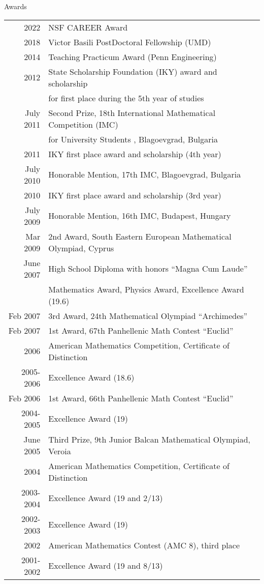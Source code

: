 \documentclass{resume} %
\begin{document}
\begin{rSection}{Awards}

  \begin{longtable}{rl}
  2022 & NSF CAREER Award \\
  2018 & Victor Basili PostDoctoral Fellowship (UMD)\\
  2014	 & Teaching Practicum Award (Penn Engineering) \\
  2012 & State Scholarship Foundation (IKY) award and scholarship \\
       & for first place during the 5th year of studies \\
  July  2011  &  Second  Prize,  18th  International Mathematical Competition (IMC) \\
  &  for University Students , Blagoevgrad, Bulgaria \\
  2011 & IKY first place award and scholarship (4th year)\\
  July 2010 &  Honorable Mention,  17th IMC, Blagoevgrad, Bulgaria \\
  2010 & IKY first place award and scholarship (3rd year)\\
  July 2009 &  Honorable Mention,  16th IMC, Budapest, Hungary\\
  Mar 2009  &  2nd Award, South Eastern European Mathematical Olympiad, Cyprus\\

  June  2007 &   High  School  Diploma with  honors  “Magna  Cum  Laude”\\
             &   Mathematics Award, Physics Award,  Excellence Award (19.6)\\
  Feb 2007 &  3rd Award, 24th Mathematical Olympiad “Archimedes”\\
  Feb 2007 &  1st Award, 67th Panhellenic Math Contest “Euclid”\\
  2006 &  American Mathematics Competition, Certificate of Distinction\\
  2005-2006 &  Excellence Award (18.6)\\
  Feb 2006 &  1st Award, 66th Panhellenic Math Contest “Euclid”\\
  2004-2005 &  Excellence Award (19)\\
  June 2005 &  Third Prize, 9th Junior Balcan Mathematical Olympiad, Veroia\\
  2004 &  American Mathematics Competition, Certificate of Distinction\\
  2003-2004&  Excellence Award (19 and 2/13)\\
  2002-2003&  Excellence Award (19)\\
  2002 & American Mathematics Contest (AMC 8), third place\\
  2001-2002&  Excellence Award (19 and 8/13)\\
  
\end{longtable}

\end{rSection}
\end{document}
